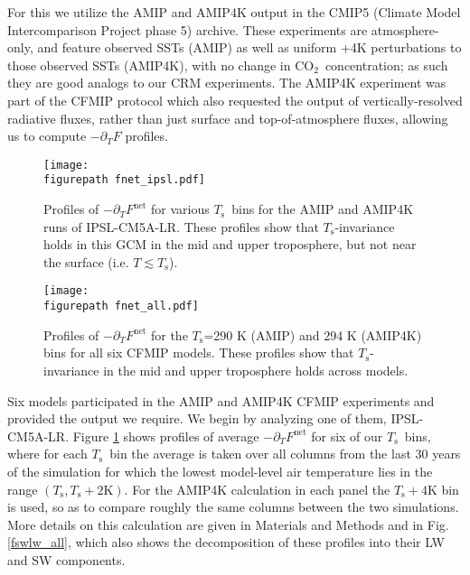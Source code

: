 \documentclass[9pt,twocolumn,twoside,lineno]{pnas-new}
\newcommand{\ppt}{\ensuremath{\partial_T}}
\newcommand{\cotwo}{\ensuremath{\mathrm{CO_2}}}
\newcommand{\Fnet}{\ensuremath{F^\mathrm{net}}}
\newcommand{\Ts}{\ensuremath{T_\mathrm{s}}}
\newcommand{\Kelvin}{\ensuremath{\mathrm{K}}}
\newcommand{\figurepath}{../../figures/}
\begin{document}
For this we utilize the AMIP and AMIP4K  output in the CMIP5 (Climate Model Intercomparison Project phase 5) archive. These experiments are atmosphere-only, and feature observed SSTs (AMIP) as well as uniform +4K perturbations to those observed SSTs (AMIP4K), with no change in \cotwo\ concentration; as such they are good analogs to our CRM experiments. The AMIP4K experiment was part of the CFMIP protocol \cite[Cloud Feedback Model Intercomparison Project,][]{bony2011} which also requested the output of vertically-resolved radiative fluxes, rather than just surface and top-of-atmosphere fluxes, allowing us to compute $-\ppt F$ profiles.

\begin{figure}[t]
	\begin{center}
			\texttt{[image: \\figurepath fnet\_ipsl.pdf]}
		\caption{ Profiles of $-\ppt \Fnet$ for various \Ts\ bins for the AMIP and AMIP4K runs of IPSL-CM5A-LR.  These profiles show that \Ts-invariance holds in this GCM in the mid and upper troposphere, but not near the surface (i.e. $T \lesssim \Ts$).
		\label{fnet_ipsl}
		}
	\end{center}
\end{figure}


\begin{figure}[t]
	\begin{center}
			\texttt{[image: \\figurepath fnet\_all.pdf]}
		\caption{ Profiles of $-\ppt \Fnet$ for the \Ts=290 K (AMIP) and 294 K (AMIP4K) bins for all six CFMIP models. These profiles show that \Ts-invariance in the mid and upper troposphere holds across models.
		\label{fnet_all}
		}
	\end{center}
\end{figure}

Six models participated in the AMIP and AMIP4K CFMIP experiments and provided the output we require. We begin by analyzing one of them, IPSL-CM5A-LR. Figure \ref{fnet_ipsl} shows  profiles of average $-\ppt \Fnet$ for six of our \Ts\ bins, where for each \Ts\ bin the average is taken over  all columns from the last 30 years of the simulation for which the lowest model-level air temperature lies in the range $(\Ts,\Ts +2\Kelvin)$. For the AMIP4K calculation in each panel the $\Ts +4\Kelvin$ bin is used, so as to compare roughly the same columns between the two simulations. More details on this calculation are given in Materials and Methods and in Fig. \ref{fswlw_all}, which also shows the decomposition of these profiles into their LW and SW components. 
\end{document}
